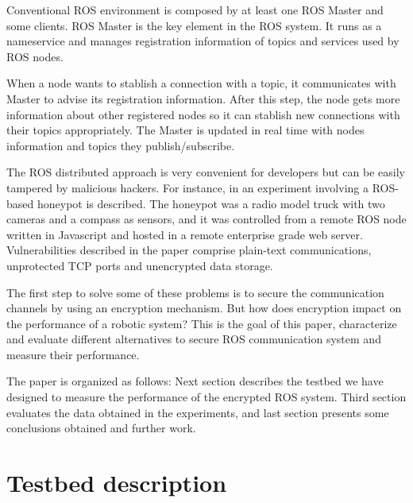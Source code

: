 \documentclass[journal,twoside]{JoPhA}
\begin{document}
Conventional ROS environment is composed by at least one ROS Master and some clients. ROS Master is the key element in the ROS system. It runs as a nameservice and manages registration information of topics and services used by ROS nodes. 

When a node wants to stablish a connection with a topic, it communicates with Master to advise its registration information. After this step, the node gets more information about other registered nodes so it can stablish new connections with their topics appropriately. The Master is updated in real time with nodes information and topics they publish/subscribe.


The ROS distributed approach is very convenient for developers but can be easily tampered by malicious hackers. For instance, in \cite{McClean2013} an experiment involving a ROS-based honeypot is described. The honeypot was a radio model truck with two cameras and a compass as sensors, and it was controlled from a remote ROS node written in Javascript and hosted in a remote enterprise grade web server. Vulnerabilities described in the paper comprise plain-text communications, unprotected TCP ports and unencrypted data storage.

The first step to solve some of these problems is to secure the communication channels by using an encryption mechanism. But how does encryption impact on the performance of a robotic system? This is the goal of this paper, characterize and evaluate different alternatives to secure ROS communication system and measure their performance.


The paper is organized as follows: Next section describes the testbed we have designed to measure the performance of the encrypted ROS system. Third section evaluates the data obtained in the experiments, and last section presents some conclusions obtained and further work.



\section{Testbed description}
\end{document}
